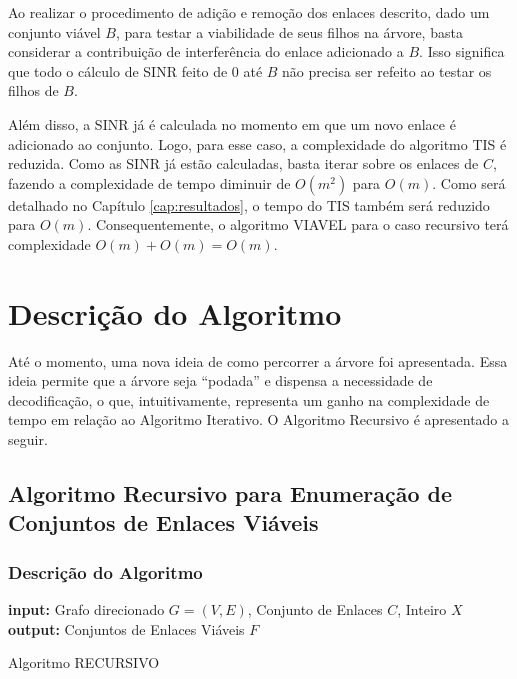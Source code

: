 Ao realizar o procedimento de adição e remoção dos enlaces descrito, dado um conjunto viável $B$, para testar a viabilidade de seus filhos na árvore, basta considerar a contribuição de interferência do enlace adicionado a $B$. Isso significa que todo o cálculo de SINR feito de 0 até $B$ não precisa ser refeito ao testar os filhos de $B$.

Além disso, a SINR já é calculada no momento em que um novo enlace é adicionado ao conjunto. Logo, para esse caso, a complexidade do algoritmo TIS é reduzida. Como as SINR já estão calculadas, basta iterar sobre os enlaces de $C$, fazendo a complexidade de tempo diminuir de $O(m^2)$ para $O(m)$. Como será detalhado no Capítulo \ref{cap:resultados}, o tempo do TIS também será reduzido para $O(m)$. Consequentemente, o algoritmo VIAVEL para o caso recursivo terá complexidade $O(m) + O(m) = O(m)$. 

\section{Descrição do Algoritmo}

Até o momento, uma nova ideia de como percorrer a árvore foi apresentada. Essa ideia permite que a árvore seja “podada” e dispensa a necessidade de decodificação, o que, intuitivamente, representa um ganho na complexidade de tempo em relação ao Algoritmo Iterativo. O Algoritmo Recursivo é apresentado a seguir.

\subsection{Algoritmo Recursivo para Enumeração de Conjuntos de Enlaces Viáveis}

\subsubsection{Descrição do Algoritmo}

\begin{algorithm}[h]
	\SetVline
	{\bf input:} Grafo direcionado $G=(V,E)$, Conjunto de Enlaces $C$, Inteiro $X$\\
	{\bf output:} Conjuntos de Enlaces Viáveis $F$\\
\caption{Algoritmo RECURSIVO}
\label{alg:recursivo}
\end{algorithm}

